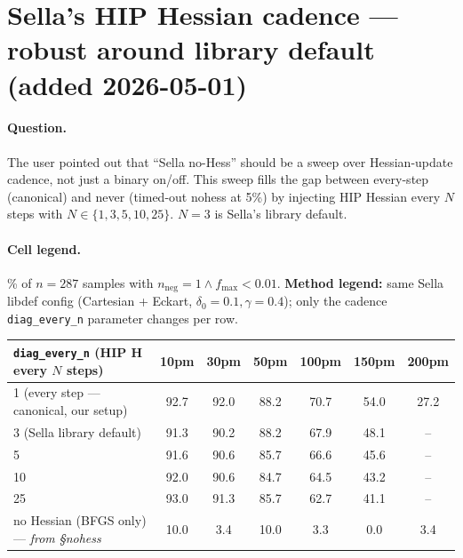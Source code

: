 \documentclass[11pt]{article}
\begin{document}
\section{Sella's HIP Hessian cadence — robust around library default (added 2026-05-01)}

\paragraph{Question.} The user pointed out that ``Sella no-Hess'' should
be a sweep over Hessian-update cadence, not just a binary on/off. This
sweep fills the gap between every-step (canonical) and never (timed-out
nohess at 5\%) by injecting HIP Hessian every $N$ steps with
$N \in \{1, 3, 5, 10, 25\}$. $N{=}3$ is Sella's library default.

\paragraph{Cell legend.} \% of $n=287$ samples with $n_{\text{neg}}=1 \wedge f_{\max}<0.01$.
\textbf{Method legend:} same Sella libdef config (Cartesian + Eckart,
$\delta_0=0.1, \gamma=0.4$); only the cadence \texttt{diag\_every\_n}
parameter changes per row.

\begin{center}\small
\begin{tabular}{l|cccccc}
\toprule
\texttt{diag\_every\_n} (HIP H every $N$ steps) & 10pm & 30pm & 50pm & 100pm & 150pm & 200pm \\
\midrule
1 (every step — canonical, our setup)  & 92.7 & 92.0 & 88.2 & 70.7 & 54.0 & 27.2 \\
3 (Sella library default)             & 91.3 & 90.2 & 88.2 & 67.9 & 48.1 & --   \\
5                                      & 91.6 & 90.6 & 85.7 & 66.6 & 45.6 & --   \\
10                                     & 92.0 & 90.6 & 84.7 & 64.5 & 43.2 & --   \\
25                                     & 93.0 & 91.3 & 85.7 & 62.7 & 41.1 & --   \\
\midrule
no Hessian (BFGS only) — \emph{from §nohess} & 10.0 & 3.4 & 10.0 & 3.3 & 0.0 & 3.4 \\
\bottomrule
\end{tabular}
\end{center}
\end{document}

